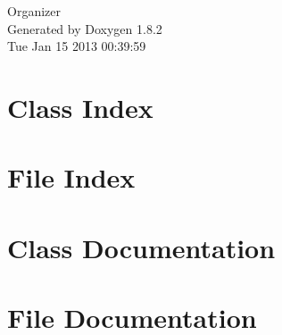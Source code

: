 \documentclass{book}
\begin{document}
\hypersetup{pageanchor=false,citecolor=blue}
\begin{titlepage}
\vspace*{7cm}
\begin{center}
{\Large Organizer }\\
\vspace*{1cm}
{\large Generated by Doxygen 1.8.2}\\
\vspace*{0.5cm}
{\small Tue Jan 15 2013 00:39:59}\\
\end{center}
\end{titlepage}
\clearemptydoublepage
{}
\tableofcontents
\clearemptydoublepage
{}
\hypersetup{pageanchor=true,citecolor=blue}
\chapter{Class Index}

\chapter{File Index}

\chapter{Class Documentation}


















\chapter{File Documentation}













\printindex
\end{document}

